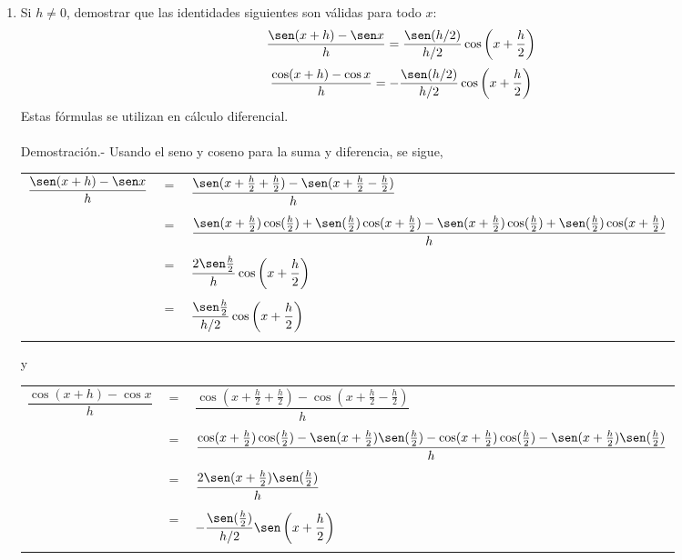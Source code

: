 \begin{enumerate}
\item Si $h\neq 0$, demostrar que las identidades siguientes son válidas para todo $x$:
    $$\dfrac{\sen(x+h)-\sen x}{h} = \dfrac{\sen(h/2)}{h/2}\cos\left(x+\dfrac{h}{2}\right)$$
    $$\dfrac{\cos(x+h)-\cos x}{h} = -\dfrac{\sen(h/2)}{h/2}\cos\left(x+\dfrac{h}{2}\right)$$
    Estas fórmulas se utilizan en cálculo diferencial.\\\\
    Demostración.-\; Usando el seno y coseno para la suma y diferencia, se sigue,
    \begin{center}
	\begin{tabular}{rcl}
	    $\dfrac{\sen(x+h)-\sen x}{h}$&$=$&$\dfrac{\sen(x+\frac{h}{2}+\frac{h}{2})-\sen(x+\frac{h}{2}-\frac{h}{2})}{h}$\\\\
					 &$=$&$\dfrac{\sen(x+\frac{h}{2})\cos(\frac{h}{2})+\sen(\frac{h}{2})\cos(x+\frac{h}{2})-\sen(x+\frac{h}{2})\cos (\frac{h}{2})+\sen(\frac{h}{2})\cos(x+\frac{h}{2})}{h}$\\\\
					 &$=$&$\dfrac{2\sen \frac{h}{2}}{h}\cos\left(x+\dfrac{h}{2}\right)$\\\\
					 &$=$&$\dfrac{\sen \frac{h}{2}}{h/2}\cos\left(x+\dfrac{h}{2}\right)$\\\\
	\end{tabular}
    \end{center}
    y
    \begin{center}
	\begin{tabular}{rcl}
	    $\dfrac{\cos(x+h)-\cos x}{h}$&$=$&$\dfrac{\cos(x+\frac{h}{2}+\frac{h}{2})-\cos(x+\frac{h}{2}-\frac{h}{2})}{h}$\\\\
					 &$=$&$\dfrac{\cos(x+\frac{h}{2})\cos(\frac{h}{2})-\sen(x+\frac{h}{2})\sen(\frac{h}{2})-\cos(x+\frac{h}{2})\cos(\frac{h}{2})-\sen(x+\frac{h}{2})\sen(\frac{h}{2})}{h}$\\\\
					 &$=$&$\dfrac{2\sen(x+\frac{h}{2})\sen(\frac{h}{2})}{h}$\\\\
					 &$=$&$-\dfrac{\sen(\frac{h}{2})}{h/2}\sen\left(x+\dfrac{h}{2}\right)$\\\\
	\end{tabular}
    \end{center}


\end{enumerate}
